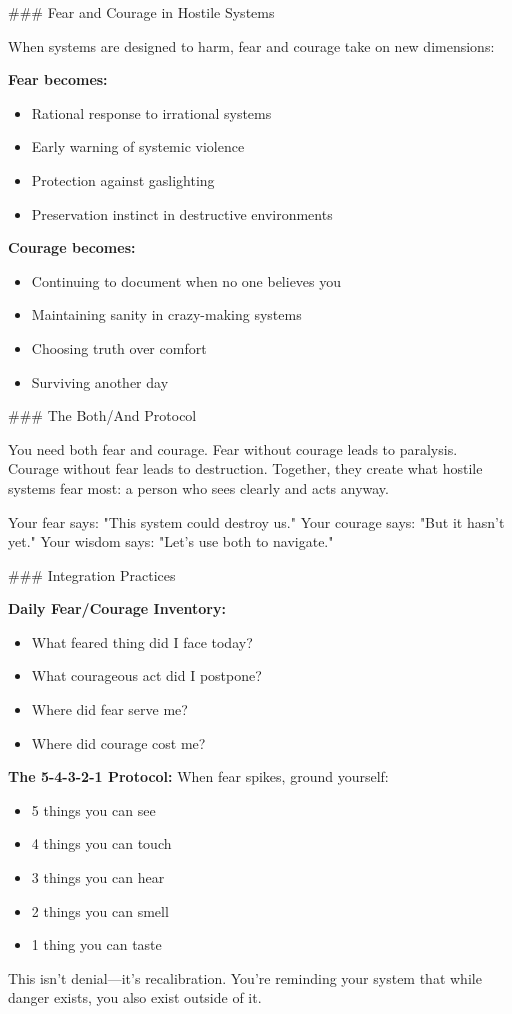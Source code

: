 \documentclass[12pt]{book}
\begin{document}
\#\#\# Fear and Courage in Hostile Systems

When systems are designed to harm, fear and courage take on new dimensions:

\textbf{Fear becomes:}
\begin{itemize}
\item Rational response to irrational systems
\item Early warning of systemic violence
\item Protection against gaslighting
\item Preservation instinct in destructive environments

\end{itemize}
\textbf{Courage becomes:}
\begin{itemize}
\item Continuing to document when no one believes you
\item Maintaining sanity in crazy-making systems
\item Choosing truth over comfort
\item Surviving another day

\end{itemize}
\#\#\# The Both/And Protocol

You need both fear and courage. Fear without courage leads to paralysis. Courage without fear leads to destruction. Together, they create what hostile systems fear most: a person who sees clearly and acts anyway.

Your fear says: "This system could destroy us."
Your courage says: "But it hasn't yet."
Your wisdom says: "Let's use both to navigate."

\#\#\# Integration Practices

\textbf{Daily Fear/Courage Inventory:}
\begin{itemize}
\item What feared thing did I face today?
\item What courageous act did I postpone?
\item Where did fear serve me?
\item Where did courage cost me?

\end{itemize}
\textbf{The 5-4-3-2-1 Protocol:}
When fear spikes, ground yourself:
\begin{itemize}
\item 5 things you can see
\item 4 things you can touch
\item 3 things you can hear
\item 2 things you can smell
\item 1 thing you can taste

\end{itemize}
This isn't denial—it's recalibration. You're reminding your system that while danger exists, you also exist outside of it.
\end{document}
